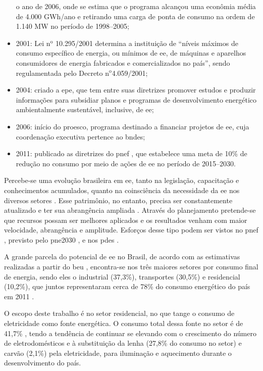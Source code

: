 \begin{itemize}
o ano de 2006, onde se estima que o programa alcançou uma econômia média de 
4.000 GWh/ano e retirando uma carga de ponta de consumo na ordem de 1.140 MW no período de 1998--2005;
\item 2001: Lei n$^\text{o}$ 10.295/2001 determina a instituição de ``níveis
máximos de consumo específico de energia, ou mínimos de \gls{ee},
de máquinas e aparelhos consumidores de energia fabricados e comercializados no
país'', sendo regulamentada pelo Decreto n$^\text{o}$4.059/2001;
\item 2004: criado a \gls{epe}, que tem entre suas diretrizes promover estudos e
produzir informações para subsidiar planos e programas de desenvolvimento
energético ambientalmente sustentável, inclusive, de \gls{ee};
\item 2006: início do \gls{proesco}, programa destinado a financiar projetos de
\gls{ee}, cuja coordenação executiva pertence ao \gls{bndes};
\item 2011: publicado as diretrizes do \gls{pnef} \cite{pnef}, que estabelece uma meta de
10\% de redução no consumo por meio de ações de \gls{ee} no período 
de 2015--2030.
\end{itemize}

Percebe-se uma evolução brasileira em \gls{ee}, tanto na legislação, 
capacitação e conhecimentos acumulados, quanto na 
coinsciência da necessidade da \gls{ee} nos diversos setores \cite{pnef}. 
Esse patrimônio, no entanto, precisa ser constantemente atualizado 
e ter sua abrangência ampliada \cite{pne30_eff_energ}. Através do planejamento pretende-se que
recursos possam ser melhores aplicados e os resultados venham com maior
velocidade, abrangência e amplitude. Esforços desse tipo podem ser vistos no
\gls{pnef} \cite{pnef}, previsto pelo \gls{pne2030} \cite{pne30_eff_energ}, e nos
\glspl{pde} \cite{pde_2020}.

A grande parcela do potencial de \gls{ee} no Brasil, de acordo com as
estimativas realizadas a partir do \gls{beu} \cite{beu}, encontra-se nos três
maiores setores por consumo final de energia, sendo eles o industrial (37,3\%), 
transportes (30,5\%) e residencial (10,2\%), que juntos representaram cerca 
de 78\% do consumo energético do país em 2011 \cite{ben2012,epe_eficiencia_2012}.

O escopo deste trabalho é no setor residencial, no que tange o consumo de eletricidade como
fonte energética. O consumo total dessa fonte no setor é de 41,7\% \cite{ben2012}, 
tendo a tendência de continuar se elevando com o crescimento do número de eletrodomésticos 
e à substituição da lenha (27,8\% do consumo no setor) e carvão (2,1\%) pela eletricidade, 
para iluminação e aquecimento durante o desenvolvimento do país. 

